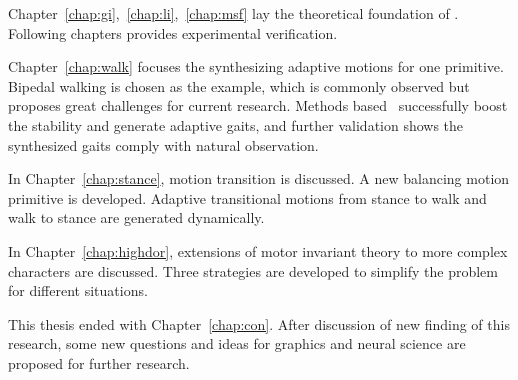Chapter~\ref{chap:gi},~\ref{chap:li},~\ref{chap:msf} lay the theoretical foundation of {\moit}.
Following chapters provides experimental verification.



Chapter~\ref{chap:walk} focuses the synthesizing adaptive motions for one primitive.
Bipedal walking is chosen as the example, which is commonly observed but proposes great challenges for current \cms research.
Methods based {\moit}\ successfully boost the stability and generate adaptive gaits, and further validation shows the synthesized gaits comply with natural observation. 

In Chapter~\ref{chap:stance}, motion transition is discussed. 
A new balancing motion primitive is developed. 
Adaptive transitional motions from stance to walk and walk to stance are generated dynamically.


In Chapter~\ref{chap:highdor}, extensions of motor invariant theory to more complex characters are discussed.
Three strategies are developed to simplify the problem for different situations.

This thesis ended with Chapter~\ref{chap:con}. 
After discussion of new finding of this research, some new questions and ideas for graphics and neural science are proposed for further research.








